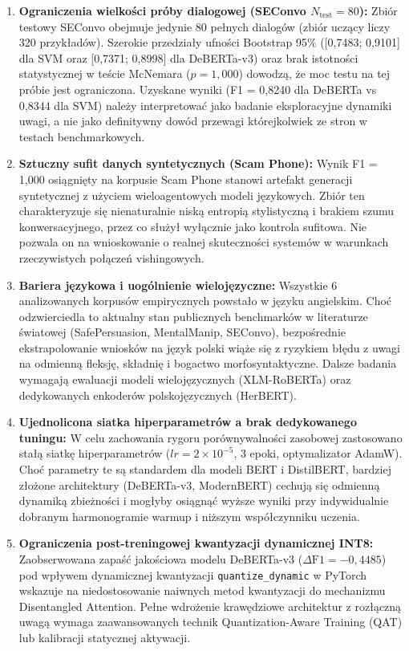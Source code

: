 \documentclass[12pt,a4paper,twoside]{report}
\begin{document}
\begin{enumerate}[leftmargin=1.5em]
  \item \textbf{Ograniczenia wielkości próby dialogowej (SEConvo $N_{\text{test}} = 80$):} Zbiór testowy SEConvo obejmuje jedynie 80 pełnych dialogów (zbiór uczący liczy 320 przykładów). Szerokie przedziały ufności Bootstrap 95\% ([0,7483; 0,9101] dla SVM oraz [0,7371; 0,8998] dla DeBERTa-v3) oraz brak istotności statystycznej w teście McNemara ($p = 1,000$) dowodzą, że moc testu na tej próbie jest ograniczona. Uzyskane wyniki (F1 = 0,8240 dla DeBERTa vs 0,8344 dla SVM) należy interpretować jako badanie eksploracyjne dynamiki uwagi, a nie jako definitywny dowód przewagi którejkolwiek ze stron w testach benchmarkowych.
  \item \textbf{Sztuczny sufit danych syntetycznych (Scam Phone):} Wynik F1 = 1,000 osiągnięty na korpusie Scam Phone stanowi artefakt generacji syntetycznej z użyciem wieloagentowych modeli językowych. Zbiór ten charakteryzuje się nienaturalnie niską entropią stylistyczną i brakiem szumu konwersacyjnego, przez co służył wyłącznie jako kontrola sufitowa. Nie pozwala on na wnioskowanie o realnej skuteczności systemów w warunkach rzeczywistych połączeń vishingowych.
  \item \textbf{Bariera językowa i uogólnienie wielojęzyczne:} Wszystkie 6 analizowanych korpusów empirycznych powstało w języku angielskim. Choć odzwierciedla to aktualny stan publicznych benchmarków w literaturze światowej (SafePersuasion, MentalManip, SEConvo), bezpośrednie ekstrapolowanie wniosków na język polski wiąże się z ryzykiem błędu z uwagi na odmienną fleksję, składnię i bogactwo morfosyntaktyczne. Dalsze badania wymagają ewaluacji modeli wielojęzycznych (XLM-RoBERTa) oraz dedykowanych enkoderów polskojęzycznych (HerBERT).
  \item \textbf{Ujednolicona siatka hiperparametrów a brak dedykowanego tuningu:} W celu zachowania rygoru porównywalności zasobowej zastosowano stałą siatkę hiperparametrów ($lr = 2 \times 10^{-5}$, 3 epoki, optymalizator AdamW). Choć parametry te są standardem dla modeli BERT i DistilBERT, bardziej złożone architektury (DeBERTa-v3, ModernBERT) cechują się odmienną dynamiką zbieżności i mogłyby osiągnąć wyższe wyniki przy indywidualnie dobranym harmonogramie warmup i niższym współczynniku uczenia.
  \item \textbf{Ograniczenia post-treningowej kwantyzacji dynamicznej INT8:} Zaobserwowana zapaść jakościowa modelu DeBERTa-v3 ($\Delta\text{F1} = -0,4485$) pod wpływem dynamicznej kwantyzacji \texttt{quantize\_dynamic} w PyTorch wskazuje na niedostosowanie naiwnych metod kwantyzacji do mechanizmu Disentangled Attention. Pełne wdrożenie krawędziowe architektur z rozłączną uwagą wymaga zaawansowanych technik Quantization-Aware Training (QAT) lub kalibracji statycznej aktywacji.
\end{enumerate}
\end{document}
